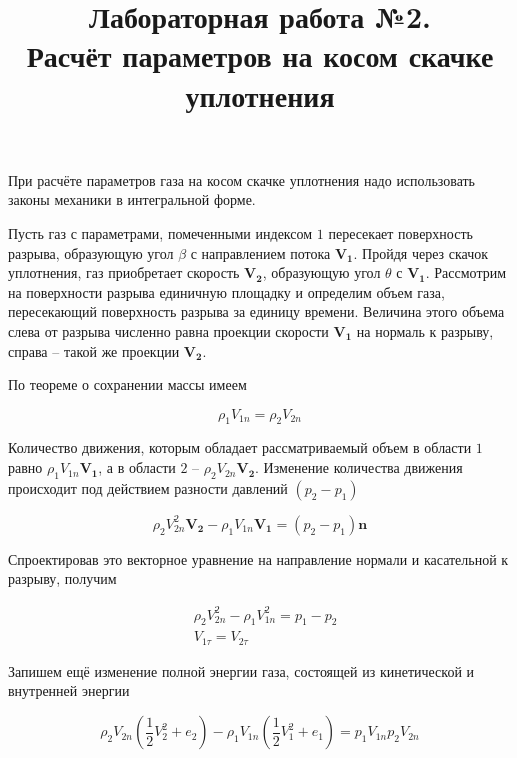 \documentclass[12pt,a4paper,oneside]{book}
\title{Лабораторная работа №2. \\ Расчёт параметров на косом скачке уплотнения}
\author{}
\date{}
\renewcommand*\vec[1]{\mathbf{#1}}
\begin{document}
  
  \maketitle
  
  При расчёте параметров газа на косом скачке уплотнения надо использовать
  законы механики в интегральной форме.
  
  Пусть газ с параметрами, помеченными индексом $1$ пересекает
  поверхность разрыва, образующую угол $\beta$ с направлением
  потока $\vec{V_1}$. Пройдя через скачок уплотнения, газ приобретает скорость
  $\vec{V_2}$, образующую угол $\theta$ с $\vec{V_1}$. Рассмотрим на поверхности
  разрыва единичную площадку и определим объем газа, пересекающий
  поверхность разрыва за единицу времени. Величина
  этого объема слева от разрыва численно равна проекции скорости $\vec{V_1}$
  на нормаль к разрыву, справа -- такой же проекции $\vec{V_2}$.
  
  По теореме о сохранении массы имеем
  
  \begin{equation}
    \label{eq:1}
    \rho_1 V_{1n} = \rho_2 V_{2n}
  \end{equation}
  
  Количество движения, которым обладает рассматриваемый
  объем в области $1$ равно $\rho_1 V_{1n} \vec{V_1}$, а в области $2$ --
  $\rho_2 V_{2n} \vec{V_2}$. Изменение количества движения происходит под действием
  разности давлений $(p_2 - p_1)$
  
  \begin{equation*}
    \label{eq:2}
    \rho_2 V_{2n}^2 \vec{V_2} - \rho_1 V_{1n} \vec{V_1} = (p_2 - p_1) \vec{n}
  \end{equation*}
  
  Спроектировав это векторное уравнение на направление нормали
  и касательной к разрыву, получим
  
  \begin{align}
    \label{eq:3}
    & \rho_2 V_{2n}^2 - \rho_1 V_{1n}^2 = p_1 - p_2 \\
    & V_{1 \tau} = V_{2 \tau}
  \end{align}
  
  Запишем ещё изменение полной энергии газа, состоящей из кинетической
  и внутренней энергии
  
  \begin{equation}
    \label{eq:4}
    \rho_2 V_{2n} ( \frac{1}{2} V_2^2 + e_2)
      - \rho_1 V_{1n} ( \frac{1}{2} V_1^2 + e_1)
      = p_1 V_{1n} p_2 V_{2n}
  \end{equation}
  
\end{document}
